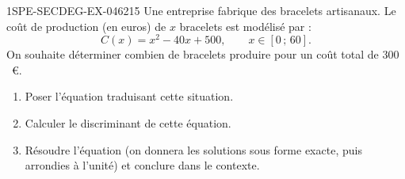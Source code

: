\begin{exercice}{1SPE-SECDEG-EX-046}{2}{15}
Une entreprise fabrique des bracelets artisanaux. Le coût de production (en euros) de $x$ bracelets est modélisé par :
\[
C(x) = x^2 - 40x + 500, \qquad x \in [0\,;\,60].
\]
On souhaite déterminer combien de bracelets produire pour un coût total de $300$~€.

\begin{enumerate}
  \item Poser l'équation traduisant cette situation.
  \item Calculer le discriminant de cette équation.
  \item Résoudre l'équation (on donnera les solutions sous forme exacte, puis arrondies à l'unité) et conclure dans le contexte.
\end{enumerate}
\end{exercice}
